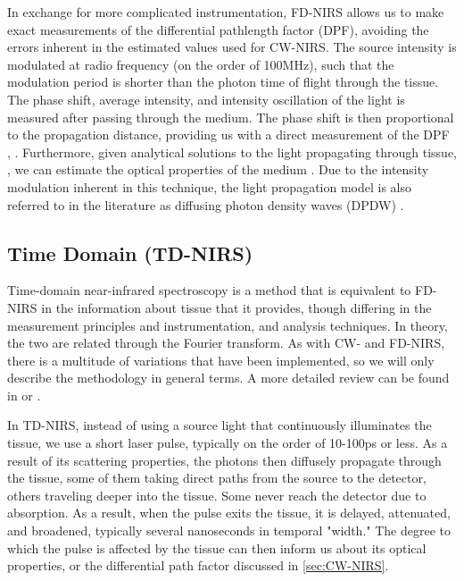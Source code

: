 In exchange for more complicated instrumentation, FD-NIRS allows us to make exact measurements of the differential pathlength factor (DPF), avoiding the errors inherent in the estimated values used for CW-NIRS. The source intensity is modulated at radio frequency (on the order of 100MHz), such that the modulation period is shorter than the photon time of flight through the tissue. The phase shift, average intensity, and intensity oscillation of the light is measured after passing through the medium. The phase shift is then proportional to the propagation distance, providing us with a direct measurement of the DPF \cite[ch. 2]{Madsen2013}, \cite[ch. 19]{Handbook} \cite{Delpy1997}. Furthermore, given analytical solutions to the light propagating through tissue, \cite{Fantini1994, Fishkin1993}, we can estimate the optical properties of the medium \cite{Franceschini1999}. Due to the intensity modulation inherent in this technique, the light propagation model is also referred to in the literature as diffusing photon density waves (DPDW) \cite{Oleary1996thesis, Fishkin1993, Boas1996thesis,}.


\subsection{Time Domain (TD-NIRS)} \label{sec:TD-NIRS}
Time-domain near-infrared spectroscopy is a method that is equivalent to FD-NIRS in the information about tissue that it provides, though differing in the measurement principles and instrumentation, and analysis techniques. In theory, the two are related through the Fourier transform. As with CW- and FD-NIRS, there is a multitude of variations that have been implemented, so we will only describe the methodology in general terms. A more detailed review can be found in \cite{Torricelli2014} or \cite[ch. 20]{Handbook}.

In TD-NIRS, instead of using a source light that continuously illuminates the tissue, we use a short laser pulse, typically on the order of 10-100ps or less. As a result of its scattering properties, the photons then diffusely propagate through the tissue, some of them taking direct paths from the source to the detector, others traveling deeper into the tissue. Some never reach the detector due to absorption. As a result, when the pulse exits the tissue, it is delayed, attenuated, and broadened, typically several nanoseconds in temporal "width." The degree to which the pulse is affected by the tissue can then inform us about its optical properties, or the differential path factor discussed in \autoref{sec:CW-NIRS}. 

